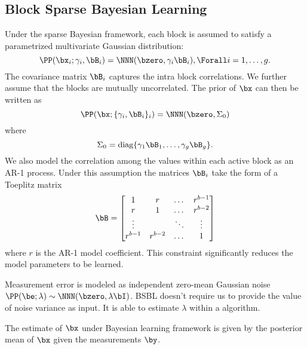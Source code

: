 \subsection{Block Sparse Bayesian Learning}
Under the sparse Bayesian framework, each block
is assumed to satisfy a parametrized multivariate
Gaussian distribution:
\begin{equation}
\PP(\bx_i ; \gamma_i, \bB_i) = \NNN(\bzero, \gamma_i \bB_i), \Forall i=1,\dots,g.
\end{equation}
The covariance matrix $\bB_i$ captures the intra block correlations.
We further assume that the blocks are mutually uncorrelated.
The prior of $\bx$ can then be written as
\begin{equation}
\PP(\bx; \{ \gamma_i, \bB_i\}_i ) = \NNN(\bzero, \Sigma_0)
\end{equation}
where
\begin{equation}
\Sigma_0 = \text{diag}\{\gamma_1 \bB_1, \dots, \gamma_g \bB_g \}.
\end{equation}
We also model the correlation among the values
within each active block as an AR-1 process.
Under this assumption the matrices
$\bB_i$ take the form of a Toeplitz matrix
\begin{equation}
\bB = \begin{bmatrix}
1 & r & \dots & r^{b-1}\\
r & 1 & \dots & r^{b-2}\\
\vdots &  & \ddots & \vdots\\
r^{b-1} & r^{b-2} & \dots & 1
\end{bmatrix}
\end{equation}
where $r$ is the AR-1 model coefficient.
This constraint significantly reduces the model parameters to be learned.

Measurement error is modeled as independent zero-mean Gaussian
noise $\PP(\be; \lambda) \sim \NNN(\bzero, \lambda \bI)$.
BSBL doesn't require us to provide the value of noise variance
as input.
It is able to estimate $\lambda$ within a algorithm.

The estimate of $\bx$ under Bayesian learning framework
is given by the posterior mean of $\bx$ given the measurements $\by$.




